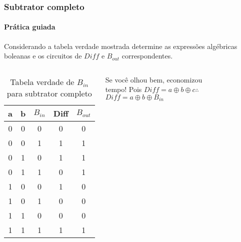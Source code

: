 \begin{frame}
	\frametitle{Subtrator completo}
	\framesubtitle{\textbf{Prática guiada}}
	\par Considerando a tabela verdade mostrada determine as expressões algébricas boleanas e os circuitos de $Diff$ e $B_{out}$ correspondentes.
	\begin{columns}
		\begin{table}[h!]
			\centering
			\begin{tabular}{|c|c|c|c|c|}
				\hline
				a & b & $B_{in}$ & Diff & $B_{out}$ \\
				\hline
				0 & 0 & 0 & 0 & 0 \\
				0 & 0 & 1 & 1 & 1 \\
				0 & 1 & 0 & 1 & 1 \\
				0 & 1 & 1 & 0 & 1 \\
				1 & 0 & 0 & 1 & 0 \\
				1 & 0 & 1 & 0 & 0 \\
				1 & 1 & 0 & 0 & 0 \\
				1 & 1 & 1 & 1 & 1 \\
				\hline
			\end{tabular}
			\caption{Tabela verdade de $B_{in}$ para subtrator completo}
			\label{tab:full_subtractor2}
		\end{table}
		\pause
		\par Se você olhou bem, economizou tempo! Pois $Diff = a \oplus b \oplus c \therefore$ $\boxed{Diff=a \oplus b \oplus B_{in}}$
		\pause
		\begin{figure}
			\centering
			
			\label{fig:subtratorcompletoparte01}
		\end{figure}
	\end{columns}
\end{frame}
